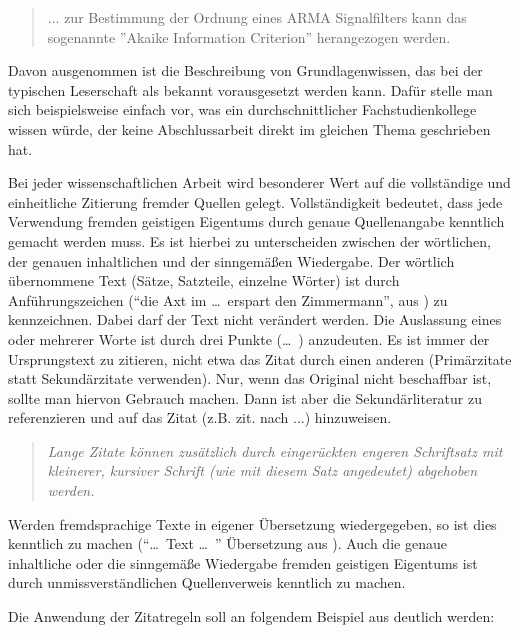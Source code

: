 \begin{quote}
	... zur Bestimmung der Ordnung eines ARMA Signalfilters kann das sogenannte ''Akaike Information Criterion'' \cite{Akaike1974a} herangezogen werden.
\end{quote}

Davon ausgenommen ist die Beschreibung von Grundlagenwissen, das bei der typischen Leserschaft als bekannt vorausgesetzt werden kann. Dafür stelle man sich beispielsweise einfach vor, was ein durchschnittlicher Fachstudienkollege wissen würde, der keine Abschlussarbeit direkt im gleichen Thema geschrieben hat.

Bei jeder wissenschaftlichen Arbeit wird besonderer Wert auf die vollständige und einheitliche Zitierung fremder Quellen gelegt. Vollständigkeit bedeutet, dass jede Verwendung fremden geistigen Eigentums durch genaue Quellenangabe kenntlich gemacht werden muss. Es ist hierbei zu unterscheiden
zwischen der wörtlichen, der genauen inhaltlichen und der sinngemäßen Wiedergabe. Der wörtlich übernommene Text (Sätze, Satzteile, einzelne Wörter) ist durch Anführungszeichen ("`die Axt im \ldots\  erspart den Zimmermann"', aus \cite{Schiller:Tell}) zu kennzeichnen. Dabei darf der Text nicht
verändert werden. Die Auslassung eines oder mehrerer Worte ist durch drei Punkte (\ldots\ ) anzudeuten. Es ist immer der Ursprungstext zu zitieren, nicht etwa das Zitat durch einen anderen (Primärzitate statt Sekundärzitate verwenden). Nur, wenn das Original nicht beschaffbar ist, sollte man hiervon Gebrauch machen. Dann ist aber die Sekundärliteratur zu referenzieren und auf das Zitat (z.B. zit. nach ...) hinzuweisen.

\begin{quote}\rmfamily\small\itshape
	Lange Zitate können zusätzlich durch eingerückten engeren Schriftsatz mit kleinerer, kursiver Schrift (wie mit diesem Satz angedeutet) abgehoben werden.\end{quote}

Werden fremdsprachige Texte in eigener Übersetzung wiedergegeben, so ist dies kenntlich zu machen
("`\ldots\  Text \ldots\ "' Übersetzung aus \cite{Akaike1974a}). Auch die genaue inhaltliche oder die sinngemäße Wiedergabe fremden geistigen Eigentums ist durch unmissverständlichen Quellenverweis kenntlich zu machen.

Die Anwendung der Zitatregeln soll an folgendem Beispiel aus \cite{web_pruschmann} deutlich werden:

